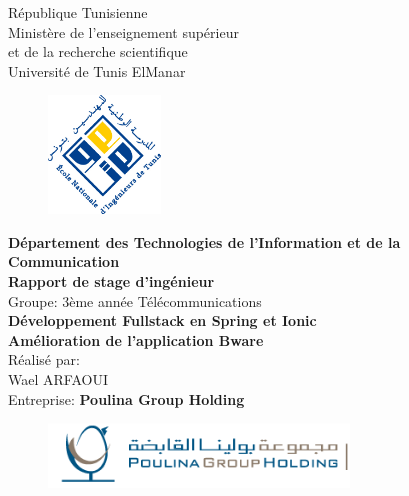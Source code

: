 \documentclass[11pt,fleqn]{book} %
\begin{document}
	\let\cleardoublepage\clearpage
	\begingroup
	\thispagestyle{empty}
	
	\centering

	\par République Tunisienne\\
	Ministère de l'enseignement supérieur\\
	et de la recherche scientifique\\
	Université de Tunis ElManar\par 
	\begin{figure}[!h]
		\begin{center}
			\includegraphics[width=3cm]{figures/enit}
		\end{center}
	\end{figure}
\textbf{	Département des Technologies de l’Information et de la Communication\\}
	\vspace{1cm}
	\textbf{{\Large Rapport de stage d’ingénieur\\}}
	Groupe: 3ème année Télécommunications\\
	\vspace*{1cm}
	\textbf{{\LARGE Développement Fullstack en Spring et Ionic\\
	Amélioration de l'application Bware\\}}
	\vspace{1cm}
	Réalisé par:\\
	\vspace{0.5cm}
	{\Large Wael ARFAOUI}\\
	\vspace{1cm}
	Entreprise: \textbf{Poulina Group Holding}
	
	\begin{figure}[!h]
		\begin{center}
			\includegraphics[width=8cm]{figures/poulina}
		\end{center}
	\end{figure}
\end{document}
